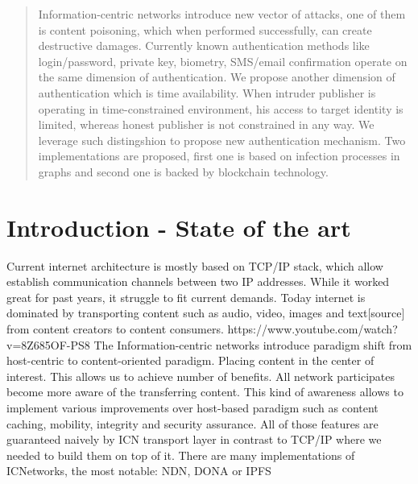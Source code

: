 \documentclass[nostrict]{szablonPG}
\begin{document}
\tableofcontents
\listoffigures


\begin{abstract}
Information-centric networks introduce new vector of attacks, one of them is content poisoning, which when performed successfully, can create destructive damages. Currently known authentication methods like login/password, private key, biometry, SMS/email confirmation operate on the same dimension of authentication. We propose another dimension of authentication which is time availability. When intruder publisher is operating in time-constrained environment, his access to target identity is limited, whereas honest publisher is not constrained in any way. We leverage such distingshion to propose new authentication mechanism. Two implementations are proposed, first one is based on infection processes in graphs and second one is backed by blockchain technology. 


\end{abstract}


\section{Introduction - State of the art}
Current internet architecture is mostly based on TCP/IP stack, which allow  establish communication channels between two IP addresses. While it worked great for past years,  it struggle to fit current demands. Today internet is dominated by transporting content such as audio, video, images and text[source] from content creators to content consumers. 
https://www.youtube.com/watch?v=8Z685OF-PS8
The Information-centric networks introduce paradigm shift from host-centric to content-oriented paradigm. Placing content in the center of interest. This allows us to achieve number of benefits. All network participates become more aware of the transferring content. This kind of awareness allows to implement various improvements over host-based paradigm such as content caching, mobility, integrity and security assurance. All of those features are guaranteed naively by ICN transport layer in contrast to TCP/IP where we needed to build them on top of it. There are many implementations of ICNetworks, the most notable:  NDN\cite{zhang2014named}, DONA\cite{koponen2007data} or IPFS \cite{benet2014ipfs}
\end{document}

